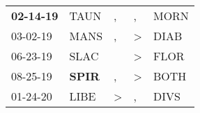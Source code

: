 \begin{supertabular}{p{0.07\textwidth}p{0.06\textwidth}p{0.02\textwidth}p{0.02\textwidth}p{0.06\textwidth}}
 \textbf{02-14-19\textsuperscript{}} &           TAUN\textsuperscript{} &                , &                , &           MORN\textsuperscript{} \\
          03-02-19\textsuperscript{} &           MANS\textsuperscript{} &                , &     \textgreater &           DIAB\textsuperscript{} \\
          06-23-19\textsuperscript{} &           SLAC\textsuperscript{} &                  &     \textgreater &           FLOR\textsuperscript{} \\
          08-25-19\textsuperscript{} &  \textbf{SPIR\textsuperscript{}} &                , &     \textgreater &           BOTH\textsuperscript{} \\
          01-24-20\textsuperscript{} &           LIBE\textsuperscript{} &     \textgreater &                , &           DIVS\textsuperscript{} \\
\end{supertabular}
